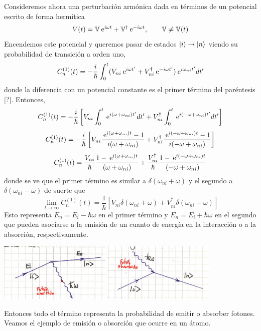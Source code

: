 \documentclass[10pt,oneside]{CBFT_book}
\begin{document}
Consideremos ahora una perturbación armónica dada en términos de un potencial escrito de forma
hermítica
\[
	V(t) = \mathbb{V} \:\mathrm{e}^{i\omega t} + \mathbb{V}^\dagger \:\mathrm{e}^{-i\omega t},
		\qquad \mathbb{V}\neq \mathbb{V}(t)
\]
Encendemos este potencial y queremos pasar de estados $\Ket{i} \to \Ket{n}$ viendo su probabilidad de 
transición a orden uno,
\[
	C_n^{(1)}(t) = -\frac{i}{\hbar} 
	\int_0^t ( V_{ni}\:\mathrm{e}^{i\omega t'}+ V_{ni}^\dagger \:\mathrm{e}^{-i\omega t'} )
	\:\mathrm{e}^{i\omega_{ni}t'}dt'
\]
donde la diferencia con un potencial constante es el primer término del paréntesis [?]. Entonces,
\[
	C_n^{(1)}(t) = -\frac{i}{\hbar} \left[ V_{ni} \int_0^t \:\mathrm{e}^{i(\omega +\omega_{ni})t'} dt' + 
		V_{ni}^\dagger \int_0^t \:\mathrm{e}^{i(-\omega +\omega_{ni})t'} dt' \right]
\]
\[
	C_n^{(1)}(t) = -\frac{i}{\hbar} \left[ V_{ni} 
	\frac{\:\mathrm{e}^{i(\omega +\omega_{ni})t} -1}{i( \omega +\omega_{ni} )}
	+ V_{ni}^\dagger \frac{\:\mathrm{e}^{i(-\omega +\omega_{ni})t} - 1}{i(-\omega +\omega_{ni})} \right]
\]
\[
	C_n^{(1)}(t) = \frac{V_{ni}}{\hbar} \frac{1-\:\mathrm{e}^{i(\omega +\omega_{ni})t}}{( \omega +\omega_{ni} )}
	+ \frac{V_{ni}^\dagger}{\hbar} \frac{1-\:\mathrm{e}^{i(-\omega +\omega_{ni})t}}{(-\omega +\omega_{ni})}
\]
donde se ve que el primer término es similar a $\delta(\omega_{ni} +\omega)$ y el segundo a
$\delta(\omega_{ni} - \omega)$ de suerte que
\[
	\lim_{t\to\infty} C_n^{(1)}(t) = \frac{1}{\hbar}\left[ V_{ni}\delta(\omega_{ni}+\omega) 
		+ V_{ni}^\dagger \delta(\omega_{ni}-\omega) \right]
\]
Esto representa $E_n = E_i - \hbar \omega$ en el primer término y $E_n = E_i + \hbar \omega$ en el segundo
que pueden asociarse a la emisión de un cuanto de energía en la interacción o a la absorción, respectivamente.

\includegraphics[width=0.4\textwidth]{images/fig_ft2_perturbativos_1a.jpg}
\includegraphics[width=0.4\textwidth]{images/fig_ft2_perturbativos_1b.jpg}

Entonces todo el término representa la probabilidad de emitir o absorber fotones.
Veamos el ejemplo de emisión o absorción que ocurre en un átomo.
\end{document}
